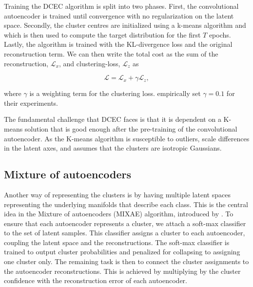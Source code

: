 Training the DCEC algorithm is split into two phases. First, the convolutional autoencoder is trained until convergence with no regularization on the latent space. Secondly, the cluster centres are initialized using a k-means algorithm and which is then used to compute the target distribution for the first $T$ epochs. Lastly, the algorithm is trained with the KL-divergence loss and the original reconstruction term. We can then write the total cost as the sum of the reconstruction, $\mathcal{L}_x$, and clustering-loss, $\mathcal{L}_z$ as 

\begin{equation}
\mathcal{L} = \mathcal{L}_x + \gamma \mathcal{L}_z,
\end{equation}

\noindent where $\gamma$ is a weighting term for the clustering loss. \cite{Guo2017} empirically set $\gamma=0.1$ for their experiments. 

The fundamental challenge that DCEC faces is that it is dependent on a K-means solution that is good enough after the pre-training of the convolutional autoencoder. As the K-means algorithm is susceptible to outliers, scale differences in the latent axes,  and assumes that the clusters are isotropic Gaussians. 

\subsection{Mixture of autoencoders}\label{sec:mixae}

Another way of representing the clusters is by having multiple latent spaces representing the underlying manifolds that describe each class. This is the central idea in the Mixture of autoencoders (MIXAE) algorithm, introduced by  \cite{Zhang}. To ensure that each autoencoder represents a cluster, we attach a soft-max classifier to the set of latent samples. This classifier assigns a cluster to each autoencoder, coupling the latent space and the reconstructions. The soft-max classifier is trained to output cluster probabilities and penalized for collapsing to assigning one cluster only. The remaining task is then to connect the cluster assignments to the autoencoder reconstructions. This is achieved by multiplying by the cluster confidence with the reconstruction error of each autoencoder.

